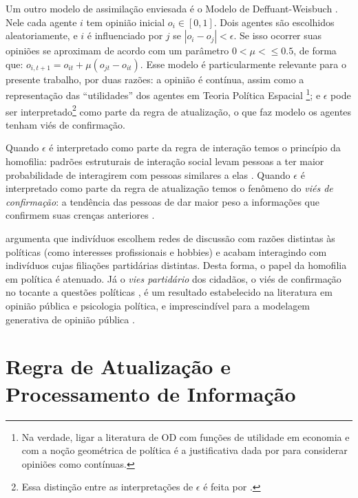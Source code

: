   Um outro modelo de assimilação enviesada é o Modelo de Deffuant-Weisbuch
  \cite{deffuant2000mixing}. Nele cada agente \(i\) tem opinião inicial \( o_i \in
  [0,1]\). Dois agentes são escolhidos aleatoriamente, e \(i\) é influenciado
  por \(j\) se \(| o_i - o_j| < \epsilon\). Se isso ocorrer suas opiniões se aproximam
  de acordo com um parâmetro $0 < \mu< \leq 0.5$, de forma que: $o_{i,t+1} = o_{it} +
  \mu(o_{jt} - o_{it})$. Esse modelo é particularmente relevante para o presente
  trabalho, por duas razões: a opinião é contínua, assim como a representação
  das ``utilidades'' dos agentes em Teoria Política Espacial \footnote{Na
    verdade, ligar a literatura de OD com funções de utilidade em economia e com
    a noção geométrica de política é a justificativa dada por
     para considerar opiniões como contínuas.}; e
  \(\epsilon\) pode ser interpretado\footnote{Essa distinção entre as interpretações de
    \(\epsilon\) é feita por .} como parte da regra de
  atualização, o que faz modelo os agentes tenham viés de confirmação.

Quando \(\epsilon\) é interpretado como parte da regra de interação temos o princípio
da homofilia: padrões estruturais de interação social levam pessoas a ter maior
probabilidade de interagirem com pessoas similares a elas
\cite{mcpherson2001birds}. Quando \(\epsilon\) é interpretado como parte da regra de
atualização temos o fenômeno do \textit{viés de confirmação}: a tendência das
pessoas de dar maior peso a informações que confirmem suas crenças anteriores
\cite{nickerson1998confirmation}.

 argumenta que indivíduos escolhem redes de
discussão com razões distintas às políticas (como interesses profissionais e
hobbies) e acabam interagindo com indivíduos cujas filiações partidárias
distintas. Desta forma, o papel da homofilia em política é atenuado. Já o
\textit{vies partidário} dos cidadãos, o viés de confirmação no tocante a
questões políticas , é um resultado estabelecido na literatura em opinião
pública e psicologia política, e imprescindível para a modelagem generativa de
opinião pública \cite{bartels2002beyond, flynn2017nature,
  lodge2013rationalizing}.


\section{Regra de Atualização e Processamento de Informação}


